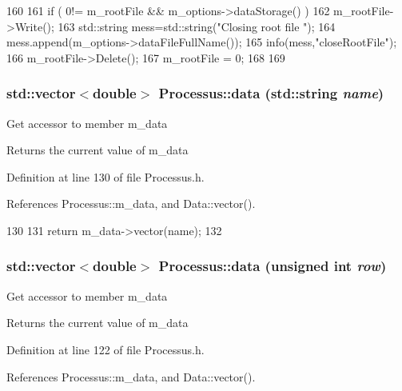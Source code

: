 \begin{DoxyCode}
160                                 {
161   if ( 0!= m_rootFile && m_options->dataStorage() ){
162     m_rootFile->Write();
163         std::string mess=std::string("Closing root file ");
164         mess.append(m_options->dataFileFullName());
165         info(mess,"closeRootFile");
166     m_rootFile->Delete();
167     m_rootFile = 0;
168   }
169 }
\end{DoxyCode}
\hypertarget{classProcessus_abf4d91fb36707e1d50178bab12d21ae9}{
\subsubsection[{data}]{\setlength{\rightskip}{0pt plus 5cm}std::vector$<$double$>$ Processus::data (std::string {\em name})}}
\label{classProcessus_abf4d91fb36707e1d50178bab12d21ae9}
Get accessor to member m\_\-data \begin{DoxyReturn}{Returns}
the current value of m\_\-data 
\end{DoxyReturn}


Definition at line 130 of file Processus.h.

References Processus::m\_\-data, and Data::vector().


\begin{DoxyCode}
130                                         {
131     return m_data->vector(name);
132   }
\end{DoxyCode}
\hypertarget{classProcessus_aa7c57483cf4b9ab0b2d0ae2de8316402}{
\subsubsection[{data}]{\setlength{\rightskip}{0pt plus 5cm}std::vector$<$double$>$ Processus::data (unsigned int {\em row})}}
\label{classProcessus_aa7c57483cf4b9ab0b2d0ae2de8316402}
Get accessor to member m\_\-data \begin{DoxyReturn}{Returns}
the current value of m\_\-data 
\end{DoxyReturn}


Definition at line 122 of file Processus.h.

References Processus::m\_\-data, and Data::vector().


